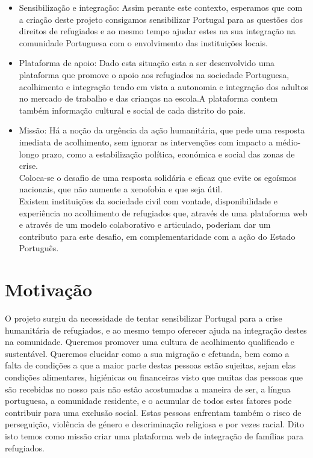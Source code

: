 \documentclass{article}
\begin{document}
\begin{itemize}
    \item Sensibilização e integração: Assim perante este contexto, esperamos que com a criação deste projeto consigamos sensibilizar Portugal para as questões dos direitos de refugiados e ao mesmo tempo ajudar estes na sua integração na comunidade Portuguesa com o envolvimento das instituições locais.
    \item Plataforma de apoio: Dado esta situação esta a ser desenvolvido uma plataforma que promove o apoio aos refugiados na sociedade Portuguesa, acolhimento e integração tendo em vista a autonomia e integração dos adultos no mercado de trabalho e das crianças na escola.A plataforma contem também informação cultural e social de cada distrito do pais. 
    \item Missão: Há a noção da urgência da ação humanitária, que pede uma resposta imediata de acolhimento, sem ignorar as intervenções com impacto a médio-longo prazo, como a estabilização política, económica e social das zonas de crise.\\Coloca-se o desafio de uma resposta  solidária e eficaz que evite os egoísmos nacionais, que não aumente a xenofobia e que seja útil.\\Existem instituições da sociedade civil com vontade, disponibilidade e experiência no acolhimento de refugiados que, através de uma plataforma web e através de um modelo colaborativo e articulado, poderiam dar um contributo para este desafio, em complementaridade com a ação do Estado Português. 


\end{itemize}

\section{Motivação}
O projeto surgiu da necessidade de tentar sensibilizar
Portugal para a crise humanitária de refugiados, e ao mesmo
tempo oferecer ajuda na integração destes na comunidade.
Queremos promover uma cultura de acolhimento qualificado
e sustentável. Queremos elucidar como a sua migração e
efetuada, bem como a falta de condições a que a maior
parte destas pessoas estão sujeitas, sejam elas condições alimentares,
higiénicas ou financeiras visto que muitas das pessoas
que são recebidas no nosso pais não estão acostumadas
a maneira de ser, a língua portuguesa, a comunidade residente,
e o acumular de todos estes fatores pode contribuir
para uma exclusão social. Estas pessoas enfrentam também
o risco de perseguição, violência de género e descriminação
religiosa e por vezes racial.
Dito isto temos como missão criar uma plataforma web de
integração de famílias para refugiados.
\end{document}
